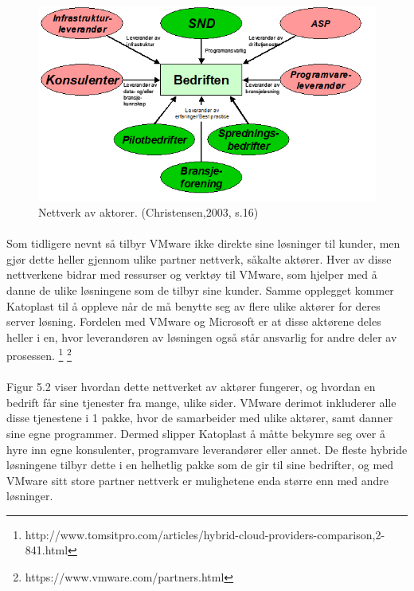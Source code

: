 \begin{figure}[H]
\centering
\includegraphics[width=6.5in]{Bilder/ss.png}
\caption{Nettverk av aktorer. (Christensen,2003, s.16)}
\end{figure}

\paragraph{} Som tidligere nevnt så tilbyr VMware ikke direkte sine løsninger til kunder, men gjør dette heller gjennom ulike partner nettverk, såkalte aktører. Hver av disse nettverkene bidrar med ressurser og verktøy til VMware, som hjelper med å danne de ulike løsningene som de tilbyr sine kunder. Samme opplegget kommer Katoplast til å oppleve når de må benytte seg av flere ulike aktører for deres server løsning. Fordelen med VMware og Microsoft er at disse aktørene deles heller i en, hvor leverandøren av løsningen også står ansvarlig for andre deler av prosessen. 
\footnote{http://www.tomsitpro.com/articles/hybrid-cloud-providers-comparison,2-841.html}
\footnote{https://www.vmware.com/partners.html}

\paragraph{} Figur 5.2 viser hvordan dette nettverket av aktører fungerer, og hvordan en bedrift får sine tjenester fra mange, ulike sider. VMware derimot inkluderer alle disse tjenestene i 1 pakke, hvor de samarbeider med ulike aktører, samt danner sine egne programmer. Dermed slipper Katoplast å måtte bekymre seg over å hyre inn egne konsulenter, programvare leverandører eller annet. De fleste hybride løsningene tilbyr dette i en helhetlig pakke som de gir til sine bedrifter, og med VMware sitt store partner nettverk er mulighetene enda større enn med andre løsninger.

